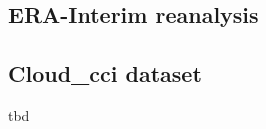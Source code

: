 

\subsection{ERA-Interim reanalysis}\label{sec:era}




\subsection{Cloud\_cci dataset}\label{sec:cloudcci}
tbd
